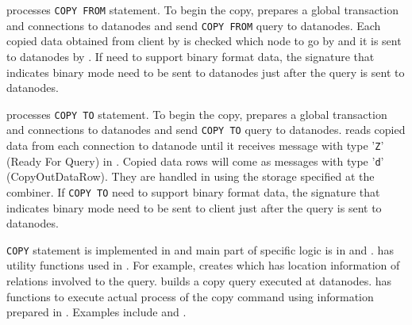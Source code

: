    processes \texttt{COPY FROM} statement.
  To begin the copy,  prepares a global transaction and connections to
  datanodes and send \texttt{COPY FROM} query to datanodes.
  Each copied data obtained from \PG{} client by  is checked which node
  to go by  and it is sent to datanodes by .
  If  need to support binary format data, the signature that indicates binary
  mode need to be sent to datanodes just after the query is sent to datanodes.
  
   processes \texttt{COPY TO} statement.
  To begin the copy,  prepares a global transaction and connections to
  datanodes and send \texttt{COPY TO} query to datanodes.
   reads copied data from each connection to datanode until it receives
  message with type '\texttt{Z}' (Ready For Query) in .
  Copied data rows will come as messages with type '\texttt{d}' (CopyOutDataRow).
  They are handled in  using the storage specified at the combiner.
  If \texttt{COPY TO} need to support binary format data, the signature that indicates binary mode
  need to be sent to \PG{} client just after the query is sent to datanodes.
  
  \texttt{COPY} statement is implemented in  and main part of
  \XC{} specific logic is in  and
  .
   has utility functions used in .
  For example,  creates 
  which has location information of relations involved to the query.
   builds a copy query executed at datanodes.
   has functions to execute actual process of the copy command
  using information prepared in .
  Examples include  and .
  


